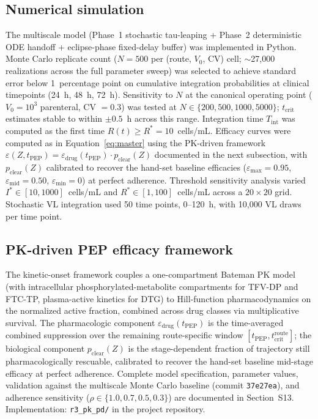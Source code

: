 \documentclass[10pt,letterpaper]{article}
\theoremstyle{definition}
\theoremstyle{remark}
\newcommand{\Tint}{T_{\text{int}}}
\newcommand{\tcrit}{t_{\text{crit}}}
\newcommand{\emax}{\varepsilon_{\max}}
\newcommand{\emid}{\varepsilon_{\text{mid}}}
\newcommand{\emin}{\varepsilon_{\min}}
\begin{document}
\subsection*{Numerical simulation}
The multiscale model (Phase~1 stochastic tau-leaping + Phase~2 deterministic ODE handoff + eclipse-phase fixed-delay buffer) was implemented in Python. Monte Carlo replicate count ($N = 500$ per (route, $V_{0}$, CV) cell; $\sim$27{,}000 realizations across the full parameter sweep) was selected to achieve standard error below 1~percentage point on cumulative integration probabilities at clinical timepoints (24~h, 48~h, 72~h). Sensitivity to $N$ at the canonical operating point ($V_{0} = 10^{3}$ parenteral, CV $= 0.3$) was tested at $N \in \{200, 500, 1000, 5000\}$; $\tcrit$ estimates stable to within $\pm 0.5$~h across this range. Integration time $\Tint$ was computed as the first time $R(t) \geq R^{*} = 10$~cells/mL. Efficacy curves were computed as in Equation~\ref{eq:master} using the PK-driven framework $\varepsilon(Z, t_{\text{PEP}}) = \varepsilon_{\text{drug}}(t_{\text{PEP}}) \cdot p_{\text{clear}}(Z)$ documented in the next subsection, with $p_{\text{clear}}(Z)$ calibrated to recover the hand-set baseline efficacies ($\emax = 0.95$, $\emid = 0.50$, $\emin = 0$) at perfect adherence. Threshold sensitivity analysis varied $I^{*} \in [10, 1000]$~cells/mL and $R^{*} \in [1, 100]$~cells/mL across a $20 \times 20$ grid. Stochastic VL integration used 50 time points, 0--120~h, with 10{,}000 VL draws per time point.

\subsection*{PK-driven PEP efficacy framework}
The kinetic-onset framework couples a one-compartment Bateman PK model (with intracellular phosphorylated-metabolite compartments for TFV-DP and FTC-TP, plasma-active kinetics for DTG) to Hill-function pharmacodynamics on the normalized active fraction, combined across drug classes via multiplicative survival. The pharmacologic component $\varepsilon_{\text{drug}}(t_{\text{PEP}})$ is the time-averaged combined suppression over the remaining route-specific window $[t_{\text{PEP}}, \tcrit^{\text{route}}]$; the biological component $p_{\text{clear}}(Z)$ is the stage-dependent fraction of trajectory still pharmacologically rescuable, calibrated to recover the hand-set baseline mid-stage efficacy at perfect adherence. Complete model specification, parameter values, validation against the multiscale Monte Carlo baseline (commit \texttt{37e27ea}), and adherence sensitivity ($\rho \in \{1.0, 0.7, 0.5, 0.3\}$) are documented in Section~S13. Implementation: \texttt{r3\_pk\_pd/} in the project repository.
\end{document}

